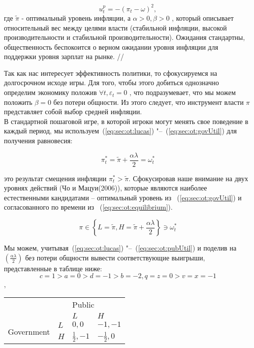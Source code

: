 \begin{equation}
\label{eq:sec:ot:pubUtil}
u^p_t=-(\pi_t - \omega)^2,
\end{equation}
где $\tilde{\pi}$ - оптимальный уровень инфляции, а $\alpha > 0, \beta > 0$ , который описывает относительный вес между целями власти (стабильной инфляции, высокой производительности и стабильной производительности). Ожидания стандартны, общественность беспокоится о верном ожидании уровня инфляции для поддержки уровня зарплат на рынке. 
//

Так как нас интересует эффективность политики, то сфокусируемся на долгосрочном исходе игры. Для того, чтобы этого добиться однозначно определим экономику положив $\forall t, \varepsilon_t=0$ , что подразумевает, что мы можем положить $\beta=0$ без потери общности. Из этого следует, что инструмент власти $\pi$  представляет собой выбор средней инфляции.
\\

В стандартной пошаговой игре, в которой игроки могут менять свое поведение в каждый период, мы используем~(\ref{eq:sec:ot:lucas}) "--~(\ref{eq:sec:ot:govUtil}) для получения равновесия:

\begin{equation}
\label{eq:sec:ot:equilibrium}
\pi^*_t= \tilde{\pi} + \frac{\alpha\lambda}{2}= \omega^*_t
\end{equation}

это результат смещения инфляции $\pi^*_t > \tilde{\pi}$. Сфокусировав наше внимание на двух уровнях действий (Чо и Мацуи(2006)), которые являются наиболее естественными кандидатами – оптимальный уровень из ~(\ref{eq:sec:ot:govUtil}) и согласованного по времени из ~(\ref{eq:sec:ot:equilibrium}).

\begin{equation}
\label{eq:sec:ot:optimal}
\pi \in \left\{L=\tilde{\pi}, H=\tilde{\pi}+\frac{\alpha\lambda}{2} \right\} \ni \omega^*_t
\end{equation}

Мы можем, учитывая~(\ref{eq:sec:ot:lucas}) "--~(\ref{eq:sec:ot:pubUtil}) и поделив на $\left(\frac{\alpha\lambda}{2}\right)$  без потери общности вывести соответствующие выигрыши, представленные в таблице ниже:
$$c=1 > a=0 > d=-1 > b=-2, q=z=0 > v=x=-1$$,
\begin{table}[h]
	\centering
	\begin{tabular}{|l|l|l|l|}
		\hline
		\multicolumn{2}{|l|}{\multirow{2}{*}{}} & \multicolumn{2}{l|}{Public} \\ \cline{3-4} 
		\multicolumn{2}{|l|}{}                  & $L$            & $H$            \\ \hline
		\multirow{2}{*}{Government}     & $L$     & $0,0$          & $-1,-1$          \\ \cline{2-4} 
		& $H$     & $\frac{1}{2},-1$          & $-\frac{1}{2},0$          \\ \hline
	\end{tabular}
\end{table}


